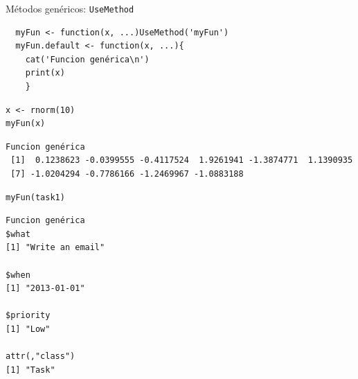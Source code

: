 \documentclass[xcolor={usenames,svgnames,dvipsnames}]{beamer}
\begin{document}
\begin{frame}[fragile,label={sec:org4859c04}]{Métodos genéricos: \texttt{UseMethod}}
 \lstset{language=r,label= ,caption= ,captionpos=b,numbers=none}
\begin{lstlisting}
  myFun <- function(x, ...)UseMethod('myFun')
  myFun.default <- function(x, ...){
    cat('Funcion genérica\n')
    print(x)
    }
\end{lstlisting}

\lstset{language=r,label= ,caption= ,captionpos=b,numbers=none}
\begin{lstlisting}
x <- rnorm(10)
myFun(x)
\end{lstlisting}

\begin{verbatim}
Funcion genérica
 [1]  0.1238623 -0.0399555 -0.4117524  1.9261941 -1.3874771  1.1390935
 [7] -1.0204294 -0.7786166 -1.2469967 -1.0883188
\end{verbatim}

\lstset{language=r,label= ,caption= ,captionpos=b,numbers=none}
\begin{lstlisting}
myFun(task1)
\end{lstlisting}

\begin{verbatim}
Funcion genérica
$what
[1] "Write an email"

$when
[1] "2013-01-01"

$priority
[1] "Low"

attr(,"class")
[1] "Task"
\end{verbatim}
\end{frame}
\end{document}
